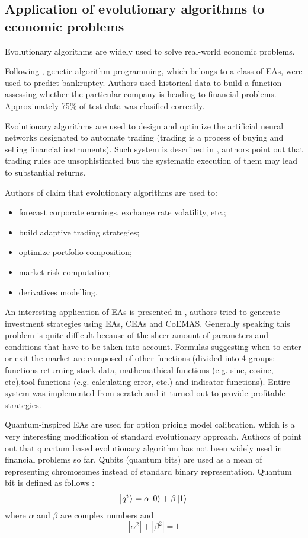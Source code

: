 \subsection{Application of evolutionary algorithms to economic problems}

Evolutionary algorithms are widely used to solve real-world economic problems.

Following \cite{EA-bankruptcy}, genetic algorithm programming, which belongs to a class of EAs, were used to predict bankruptcy.
Authors used historical data to build a function assessing whether the particular company is heading to financial problems.
Approximately 75\% of test data was clasified correctly.

Evolutionary algorithms are used to design and optimize the artificial neural networks designated to automate trading (trading is a process of buying and
 selling financial instruments).
Such system is described in \cite{trading}, authors point out that trading rules are unsophisticated but the systematic execution of them may lead to substantial 
returns.

Authors of \cite{intro_to_finance} claim that evolutionary algorithms are used to: 

\begin{itemize}
  \item forecast corporate earnings, exchange rate volatility, etc.;
  \item build adaptive trading strategies;
  \item optimize portfolio composition;
  \item market risk computation;
  \item derivatives modelling.
\end{itemize}

An interesting application of EAs is presented in \cite{Dre_Sep}, authors tried to generate investment strategies using EAs, CEAs and CoEMAS.
Generally speaking this problem is quite difficult because of the sheer amount of parameters and conditions that have to be taken into account.
Formulas suggesting when to enter or exit the market are composed of other functions (divided into 4 groups: functions returning stock data, mathemathical functions
(e.g. sine, cosine, etc),tool functions (e.g. calculating error, etc.) and indicator functions).  
Entire system was implemented from scratch and it turned out to provide profitable strategies. 

Quantum-inspired EAs are used for option pricing model calibration, which is a very interesting modification of standard evolutionary approach.
Authors of \cite{quantum} point out that quantum based evolutionary algorithm has not been widely used in financial problems so far.
Qubits (quantum bits) are used as a mean of representing chromosomes instead of standard binary representation.
Quantum bit is defined as follows \cite{quantum}:
$$
  \Ket{q^{i}} = \alpha \Ket{0} + \beta \Ket{1} \\
$$
where $\alpha$ and $\beta$ are complex numbers and
$$
  |\alpha^2| + |\beta^2| = 1 
$$

